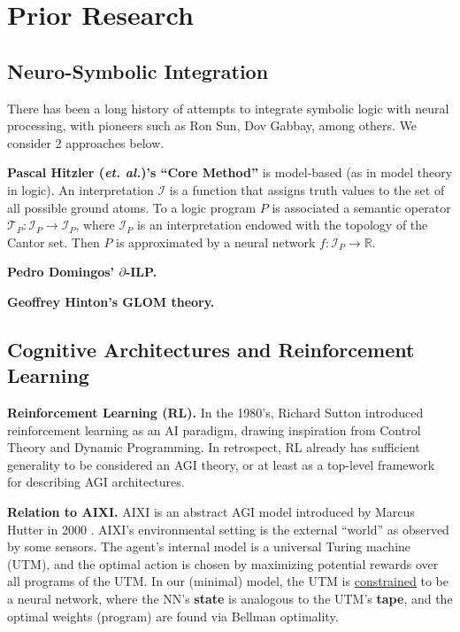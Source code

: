 \documentclass[orivec]{llncs}
\begin{document}
\section{Prior Research}

\subsection{Neuro-Symbolic Integration}

There has been a long history of attempts to integrate symbolic logic with neural processing, with pioneers such as Ron Sun, Dov Gabbay, among others.  We consider 2 approaches below.

\textbf{Pascal Hitzler (\textit{et. al.})'s ``Core Method''} \cite{Hitzler2011} is model-based (as in model theory in logic).  An interpretation $\mathcal{I}$ is a function that assigns truth values to the set of all possible ground atoms.  To a logic program $P$ is associated a semantic operator $\mathcal{T}_P : \mathcal{I}_P \rightarrow \mathcal{I}_P$, where $\mathcal{I}_P$ is an interpretation endowed with the topology of the Cantor set.  Then $P$ is approximated by a neural network $f: \mathcal{I}_P \rightarrow \mathbb{R}$.

\textbf{Pedro Domingos' $\partial$-ILP.} \cite{Domingos}

\textbf{Geoffrey Hinton's GLOM theory.} \cite{Hinton}

\subsection{Cognitive Architectures and Reinforcement Learning}

\textbf{Reinforcement Learning (RL).}  In the 1980's, Richard Sutton \cite{Sutton1984} introduced reinforcement learning as an AI paradigm, drawing inspiration from Control Theory and Dynamic Programming.  In retrospect, RL already has sufficient generality to be considered an AGI theory, or at least as a top-level framework for describing AGI architectures.

\textbf{Relation to AIXI.}  AIXI is an abstract AGI model introduced by Marcus Hutter in 2000 \cite{Hutter2000}.  AIXI's environmental setting is the external ``world'' as observed by some sensors.  The agent's internal model is a universal Turing machine (UTM), and the optimal action is chosen by maximizing potential rewards over all programs of the UTM.  In our (minimal) model, the UTM is \uline{constrained} to be a neural network, where the NN's \textbf{state} is analogous to the UTM's \textbf{tape}, and the optimal weights (program) are found via Bellman optimality.
\end{document}
